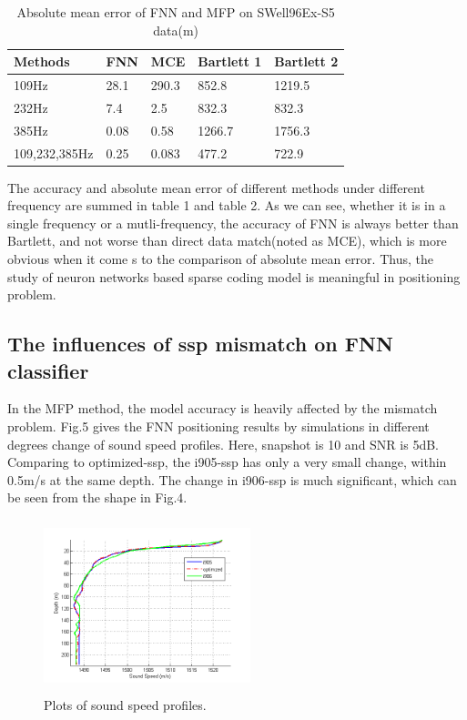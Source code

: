 \begin{table}[]
\caption{Absolute mean error of FNN and MFP on SWell96Ex-S5 data(m)}
\label{my-label}
\begin{tabular}{@{}lllll@{}}
\toprule
Methods       & FNN  & MCE   & Bartlett 1 & Bartlett 2 \\ \midrule
109Hz         & 28.1 & 290.3 & 852.8      & 1219.5     \\
232Hz         & 7.4  & 2.5   & 832.3      & 832.3      \\
385Hz         & 0.08 & 0.58  & 1266.7     & 1756.3     \\
109,232,385Hz & 0.25 & 0.083 & 477.2      & 722.9      \\ \bottomrule
\end{tabular}
\end{table}

The accuracy and absolute mean error of different methods under different frequency are summed in table 1 and table 2. As we can see, whether it is in a single frequency or a mutli-frequency, the accuracy of FNN is always better than Bartlett, and not worse than direct data match(noted as MCE), which is more obvious when it come s to the comparison of absolute mean error. Thus, the study of neuron networks based sparse coding model is meaningful in positioning problem.

\subsection{The influences of ssp mismatch on FNN classifier}
In the MFP method, the model accuracy is heavily affected by the mismatch problem\cite{tolstoy1989sensitivity,feuillade1989environmental,del1988effects}. Fig.5 gives the FNN positioning results by simulations in different degrees change of sound speed profiles. Here, snapshot is 10 and SNR is 5dB.
Comparing to optimized-ssp, the i905-ssp has only a very small change, within 0.5m/s at the same depth. The change in i906-ssp is much significant, which can be seen from the shape in Fig.4.
\begin{figure}
\includegraphics[width=6cm,height=5cm]{figure/ssp3}
\caption{Plots of sound speed profiles.}
\end{figure}

